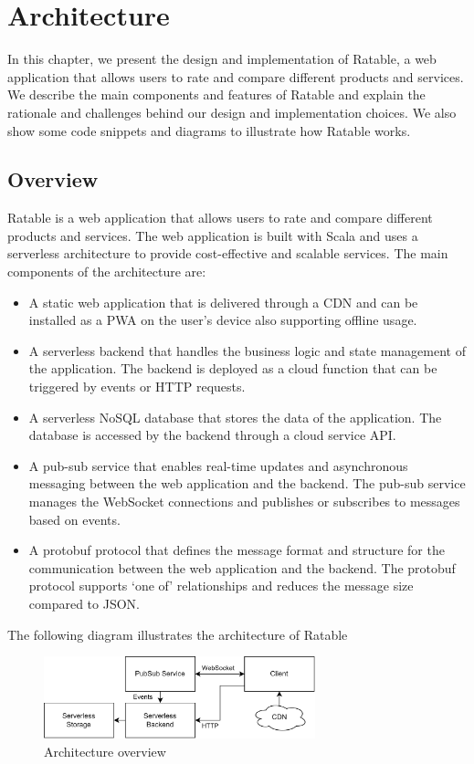 \documentclass[
	ngerman,
	ruledheaders=section,   %
	class=report,		    %
	thesis={type=bachelor}, %
	accentcolor=9c,			%
	custommargins=true,    %
	marginpar=false,        %
	parskip=half-,          %
	fontsize=11pt,          %
]{tudapub}
\begin{document}
\chapter{Architecture}

In this chapter, we present the design and implementation of Ratable, a web application that allows users to rate and compare different products and services. We describe the main components and features of Ratable and explain the rationale and challenges behind our design and implementation choices. We also show some code snippets and diagrams to illustrate how Ratable works.

\section{Overview}

Ratable is a web application that allows users to rate and compare different products and services. The web application is built with Scala and uses a serverless architecture to provide cost-effective and scalable services. The main components of the architecture are:

\begin{itemize}
  \item A static web application that is delivered through a CDN and can be installed as a PWA on the user’s device also supporting offline usage.
  \item A serverless backend that handles the business logic and state management of the application. The backend is deployed as a cloud function that can be triggered by events or HTTP requests.
  \item A serverless NoSQL database that stores the data of the application. The database is accessed by the backend through a cloud service API.
  \item A pub-sub service that enables real-time updates and asynchronous messaging between the web application and the backend. The pub-sub service manages the WebSocket connections and publishes or subscribes to messages based on events.
  \item A protobuf protocol that defines the message format and structure for the communication between the web application and the backend. The protobuf protocol supports ‘one of’ relationships and reduces the message size compared to JSON.
\end{itemize}
The following diagram illustrates the architecture of Ratable

\begin{figure}[h]
  \centering
  \includegraphics[width=0.7\textwidth]{architecture_services.png}
  \caption{Architecture overview}
\end{figure}
\end{document}

